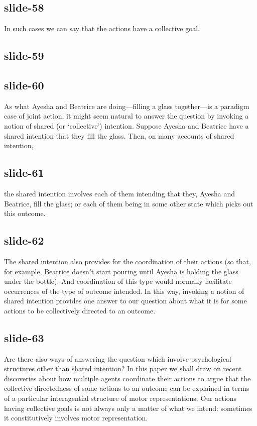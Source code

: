 \documentclass[12pt,\papersize]{extarticle}
\begin{document}
\subsection{slide-58}
In such cases we can say that the actions have a collective goal.

\subsection{slide-59}

\subsection{slide-60}
As what Ayesha and Beatrice are doing---filling a glass together---is a paradigm case of joint action, it might seem natural to answer the question by invoking a notion of shared (or `collective') intention.
Suppose Ayesha and Beatrice have a shared intention that they fill the glass.
Then, on many accounts of shared intention,

\subsection{slide-61}
the shared intention involves each of them intending that they, Ayesha and Beatrice, fill the glass;
or each of them being in some other state which picks out this outcome.

\subsection{slide-62}
The shared intention also provides for the coordination of their actions (so that, for example,
Beatrice doesn't start pouring until Ayesha is holding the glass under the bottle).  And
coordination of this type would normally facilitate occurrences of the type of outcome intended.
In this way, invoking a notion of shared intention provides one answer to our question about what
it is for some actions to be collectively directed to an outcome.

\subsection{slide-63}
Are there also ways of answering the question which involve psychological structures other than shared intention? In this paper we shall draw on recent discoveries about how multiple agents coordinate their actions to argue that the collective directedness of some actions to an outcome can be explained in terms of a particular interagential structure of motor representations.
Our actions having collective goals is not always only a matter of what we intend: sometimes it constitutively involves motor representation.
\end{document}
